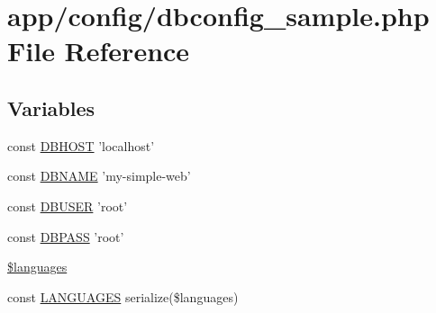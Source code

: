\hypertarget{dbconfig__sample_8php}{\section{app/config/dbconfig\-\_\-sample.php File Reference}
\label{dbconfig__sample_8php}
}
\subsection*{Variables}
\begin{DoxyCompactItemize}
\item 
const \hyperlink{dbconfig__sample_8php_a40edb9274f7711736cc3ee12d2e5ddba}{D\-B\-H\-O\-S\-T} 'localhost'
\item 
const \hyperlink{dbconfig__sample_8php_af7d219badcc93cc3a13a604c769542bc}{D\-B\-N\-A\-M\-E} 'my-\/simple-\/web'
\item 
const \hyperlink{dbconfig__sample_8php_a221f39b0b526c043e3a1ade2dd56a70e}{D\-B\-U\-S\-E\-R} 'root'
\item 
const \hyperlink{dbconfig__sample_8php_add7bef9fbed1ad1fa386dcb65fd5d813}{D\-B\-P\-A\-S\-S} 'root'
\item 
\hyperlink{dbconfig__sample_8php_a8856d0a49881ef8e0a6d205d37d4a7af}{\$languages}
\item 
const \hyperlink{dbconfig__sample_8php_a7596b0ea0c3739ff22831f52f857af58}{L\-A\-N\-G\-U\-A\-G\-E\-S} serialize(\$languages)
\end{DoxyCompactItemize}


